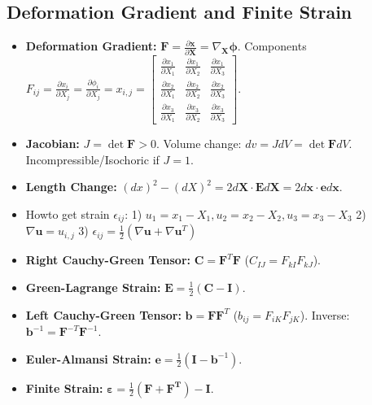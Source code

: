 \documentclass[10pt,twocolumn, a4paper]{article}
\begin{document}
\subsection{Deformation Gradient and Finite Strain}
\begin{itemize}
    \item \textbf{Deformation Gradient:} $\bm{F} = \frac{\partial \bm{x}}{\partial \bm{X}} = \nabla_{\bm{X}} \bm{\phi}$. Components $F_{ij} = \frac{\partial x_i}{\partial X_j} = \frac{\partial \phi_i}{\partial X_j} = x_{i,j} = \begin{bmatrix} \frac{\partial x_1}{\partial X_1} & \frac{\partial x_1}{\partial X_2} & \frac{\partial x_1}{\partial X_3} \\ \frac{\partial x_2}{\partial X_1} & \frac{\partial x_2}{\partial X_2} & \frac{\partial x_2}{\partial X_3} \\ \frac{\partial x_3}{\partial X_1} & \frac{\partial x_3}{\partial X_2} & \frac{\partial x_3}{\partial X_3} \end{bmatrix}$.
    \item \textbf{Jacobian:} $J = \det \bm{F} > 0$. Volume change: $dv = J dV = \det \bm{F} dV$. Incompressible/Isochoric if $J = 1$.
    \item \textbf{Length Change:} $(dx)^2 - (dX)^2 = 2d\bm{X} \cdot \bm{E} d\bm{X} = 2d\bm{x} \cdot \bm{e} d\bm{x}$.
    \item Howto get strain $\epsilon_{ij}$: 1) $u_1 = x_1 - X_1, u_2 = x_2 - X_2, u_3 = x_3 - X_3$ 2) $\nabla \bm{u} = u_{i,j} $ 3) $\epsilon_{ij} = \frac{1}{2}(\nabla \bm{u} + \nabla \bm{u}^T)$
    \item \textbf{Right Cauchy-Green Tensor:} $\bm{C} = \bm{F}^T \bm{F}$ ($C_{IJ} = F_{kI} F_{kJ}$). 
    \item \textbf{Green-Lagrange Strain:} $\bm{E} = \frac{1}{2}(\bm{C} - \bm{I})$. 
    \item \textbf{Left Cauchy-Green Tensor:} $\bm{b} = \bm{F} \bm{F}^T$ ($b_{ij} = F_{iK} F_{jK}$). Inverse: $\bm{b}^{-1} = \bm{F}^{-T} \bm{F}^{-1}$.
    \item \textbf{Euler-Almansi Strain:} $\bm{e} = \frac{1}{2}(\bm{I} - \bm{b}^{-1})$.
    \item \textbf{Finite Strain: } $\bm{\varepsilon} = \frac{1}{2}(\bm{F} + \bm{F^T}) - \bm{I}$. 
\end{itemize}
\end{document}
